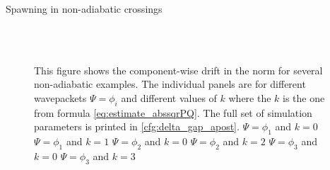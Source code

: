 \begin{chapter}{Spawning in non-adiabatic crossings}
\begin{figure}[h!]
{  } \\
   \\
  \caption[The norm drift for several non-adiabatic examples]{
  This figure shows the component-wise drift in the norm for several non-adiabatic examples.
  The individual panels are for different wavepackets $\Psi = \phi_i$ and different
  values of $k$ where the $k$ is the one from formula \eqref{eq:estimate_abssqrPQ}.
  The full set of simulation parameters is printed in \ref{cfg:delta_gap_apost}.
   $\Psi = \phi_1$ and $k=0$
   $\Psi = \phi_1$ and $k=1$
   $\Psi = \phi_2$ and $k=0$
   $\Psi = \phi_2$ and $k=2$
   $\Psi = \phi_3$ and $k=0$
   $\Psi = \phi_3$ and $k=3$
  \label{fig:spawn_delta_gap_norms_drift1}
  }
\end{figure}



\end{chapter}

